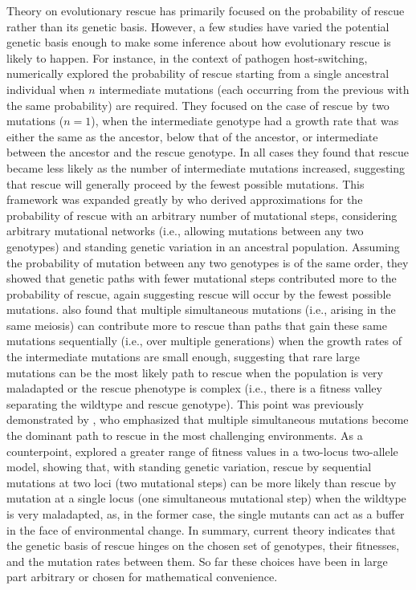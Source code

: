 \documentclass[9pt,twocolumn,twoside,lineno]{gsajnl}
\begin{document}
Theory on evolutionary rescue \citep[reviewed in][]{Alexander2014} has primarily focused on the probability of rescue rather than its genetic basis.
However, a few studies have varied the potential genetic basis enough to make some inference about how evolutionary rescue is likely to happen.
For instance, in the context of pathogen host-switching, \cite{Antia2003} numerically explored the probability of rescue starting from a single ancestral individual when $n$ intermediate mutations (each occurring from the previous with the same probability) are required.
They focused on the case of rescue by two mutations ($n=1$), when the intermediate genotype had a growth rate that was either the same as the ancestor, below that of the ancestor, or intermediate between the ancestor and the rescue genotype. 
In all cases they found that rescue became less likely as the number of intermediate mutations increased, suggesting that rescue will generally proceed by the fewest possible mutations.
This framework was expanded greatly by \cite{Iwasa2004} who derived approximations for the probability of rescue with an arbitrary number of mutational steps, considering arbitrary mutational networks (i.e., allowing mutations between any two genotypes) and standing genetic variation in an ancestral population.
Assuming the probability of mutation between any two genotypes is of the same order, they showed that genetic paths with fewer mutational steps contributed more to the probability of rescue, again suggesting rescue will occur by the fewest possible mutations.
\cite{Iwasa2004} also found that multiple simultaneous mutations (i.e., arising in the same meiosis) can contribute more to rescue than paths that gain these same mutations sequentially (i.e., over multiple generations) when the growth rates of the intermediate mutations are small enough, suggesting that rare large mutations can be the most likely path to rescue when the population is very maladapted or the rescue phenotype is complex (i.e., there is a fitness valley separating the wildtype and rescue genotype).    
This point was previously demonstrated by \cite{Alexander2010}, who emphasized that multiple simultaneous mutations become the dominant path to rescue in the most challenging environments. 
As a counterpoint, \cite{Uecker2016} explored a greater range of fitness values in a two-locus two-allele model, showing that, with standing genetic variation, rescue by sequential mutations at two loci (two mutational steps) can be more likely than rescue by mutation at a single locus (one simultaneous mutational step) when the wildtype is very maladapted, as, in the former case, the single mutants can act as a buffer in the face of environmental change. 
In summary, current theory indicates that the genetic basis of rescue hinges on the chosen set of genotypes, their fitnesses, and the mutation rates between them. 
So far these choices have been in large part arbitrary or chosen for mathematical convenience.
\end{document}
